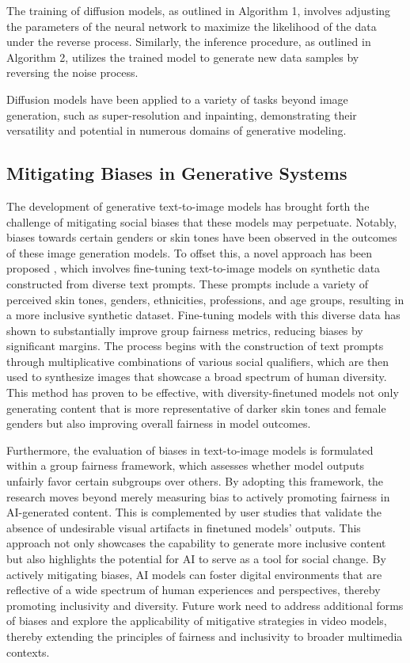 \documentclass[11pt,a4paper,oneside]{report}
\begin{document}
The training of diffusion models, as outlined in Algorithm 1, involves adjusting the parameters of the neural network to maximize the likelihood of the data under the reverse process. Similarly, the inference procedure, as outlined in Algorithm 2, utilizes the trained model to generate new data samples by reversing the noise process.

Diffusion models have been applied to a variety of tasks beyond image generation, such as super-resolution and inpainting, demonstrating their versatility and potential in numerous domains of generative modeling.

\subsection{Mitigating Biases in Generative Systems}

The development of generative text-to-image models has brought forth the challenge of mitigating social biases that these models may perpetuate. 
Notably, biases towards certain genders or skin tones have been observed in the outcomes of these image generation models. 
To offset this, a novel approach has been proposed \cite{esposito2023mitigating}, which involves fine-tuning text-to-image models on synthetic data constructed from diverse text prompts. 
These prompts include a variety of perceived skin tones, genders, ethnicities, professions, and age groups, resulting in a more inclusive synthetic dataset. 
Fine-tuning models with this diverse data has shown to substantially improve group fairness metrics, reducing biases by significant margins.
The process begins with the construction of text prompts through multiplicative combinations of various social qualifiers, which are then used to synthesize images that showcase a broad spectrum of human diversity. 
This method has proven to be effective, with diversity-finetuned models not only generating content that is more representative of darker skin tones and female genders but also improving overall fairness in model outcomes.

Furthermore, the evaluation of biases in text-to-image models is formulated within a group fairness framework, which assesses whether model outputs unfairly favor certain subgroups over others. 
By adopting this framework, the research moves beyond merely measuring bias to actively promoting fairness in AI-generated content. 
This is complemented by user studies that validate the absence of undesirable visual artifacts in finetuned models' outputs.
This approach not only showcases the capability to generate more inclusive content but also highlights the potential for AI to serve as a tool for social change. 
By actively mitigating biases, AI models can foster digital environments that are reflective of a wide spectrum of human experiences and perspectives, thereby promoting inclusivity and diversity.
Future work need to address additional forms of biases and explore the applicability of mitigative strategies in video models, thereby extending the principles of fairness and inclusivity to broader multimedia contexts.
\end{document}
